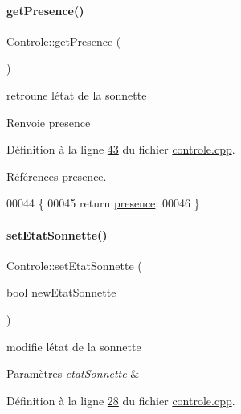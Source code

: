 \paragraph{\texorpdfstring{get\+Presence()}{getPresence()}}
{\footnotesize\ttfamily Controle\+::get\+Presence (\begin{DoxyParamCaption}{ }\end{DoxyParamCaption})}



retroune l\textquotesingle{}état de la sonnette 

\begin{DoxyReturn}{Renvoie}
presence 
\end{DoxyReturn}


Définition à la ligne \hyperlink{controle_8cpp_source_l00043}{43} du fichier \hyperlink{controle_8cpp_source}{controle.\+cpp}.



Références \hyperlink{controle_8h_source_l00071}{presence}.


\begin{DoxyCode}
00044 \{
00045     \textcolor{keywordflow}{return} \hyperlink{class_controle_a089f74f48f24f09e7fc51b03a5ede79e}{presence};
00046 \}
\end{DoxyCode}
\mbox{\label{class_controle_ac706c5e9ede46dab70631281b084e233}} 
\paragraph{\texorpdfstring{set\+Etat\+Sonnette()}{setEtatSonnette()}}
{\footnotesize\ttfamily Controle\+::set\+Etat\+Sonnette (\begin{DoxyParamCaption}\item[{bool}]{new\+Etat\+Sonnette }\end{DoxyParamCaption})}



modifie l\textquotesingle{}état de la sonnette 


\begin{DoxyParams}{Paramètres}
{\em etat\+Sonnette} & \\
\hline
\end{DoxyParams}


Définition à la ligne \hyperlink{controle_8cpp_source_l00028}{28} du fichier \hyperlink{controle_8cpp_source}{controle.\+cpp}.



